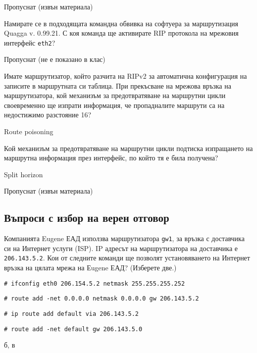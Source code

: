 \begin{q}
  Пропуснат (извън материала)
\end{q}

\begin{q}
  Намирате се в подходящата командна обвивка на софтуера за маршрутизация Quagga
  v. 0.99.21. С коя команда ще активирате RIP протокола на мрежовия интерфейс
  \texttt{eth2}?
\end{q}

\begin{q}
  Пропуснат (не е показано в клас)
\end{q}

\begin{q}
  Имате маршрутизатор, който разчита на RIPv2 за автоматична конфигурация на
  записите в маршрутната си таблица. При прекъсване на мрежова връзка на
  маршрутизатора, кой механизъм за предотвратяване на маршрутни цикли
  своевременно ще изпрати информация, че пропадналите маршрути са на недостижимо
  разстояние 16?

  \rans Route poisoning
\end{q}

\begin{q}
  Кой механизъм за предотвратяване на маршрутни цикли подтиска изпращането на
  маршрутна информация през интерфейс, по който тя е била получена?

  \rans Split horizon
\end{q}

\begin{q}
  Пропуснат (извън материала)
\end{q}

\subsection{Въпроси с избор на верен отговор}

\begin{q}
  Компанията Eugene ЕАД използва маршрутизатора \texttt{gw1}, за връзка с
  доставчика си на Интернет услуги (ISP). IP адресът на маршрутизатора на
  доставчика е \texttt{206.143.5.2}. Кои от следните команди ще позволят
  установяването на Интернет връзка на цялата мрежа на Еugene ЕАД? (Изберете
  две.)

  \begin{defractors}
  \item \texttt{\# ifconfig eth0 206.154.5.2 netmask 255.255.255.252}
  \item \texttt{\# route add -net 0.0.0.0 netmask 0.0.0.0 gw 206.143.5.2}
  \item \texttt{\# ip route add default via 206.143.5.2}
  \item \texttt{\# route add -net default gw 206.143.5.0}
  \end{defractors}

  \rans б, в
\end{q}


